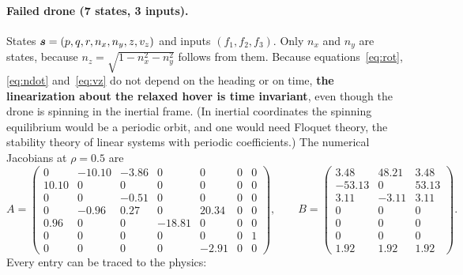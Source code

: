 \paragraph{Failed drone (7 states, 3 inputs).} States $\boldsymbol{s} = (p, q, r, n_x, n_y, z, v_z)$ and inputs $(f_1, f_2, f_3)$. Only $n_x$ and $n_y$ are states, because $n_z = \sqrt{1-n_x^2-n_y^2}$ follows from them. Because equations~\eqref{eq:rot}, \eqref{eq:ndot} and~\eqref{eq:vz} do not depend on the heading or on time, \textbf{the linearization about the relaxed hover is time invariant}, even though the drone is spinning in the inertial frame. (In inertial coordinates the spinning equilibrium would be a periodic orbit, and one would need Floquet theory, the stability theory of linear systems with periodic coefficients.) The numerical Jacobians at $\rho=0.5$ are
\begin{equation}
A = \begin{pmatrix}
 0 & -10.10 & -3.86 & 0 & 0 & 0 & 0\\
 10.10 & 0 & 0 & 0 & 0 & 0 & 0\\
 0 & 0 & -0.51 & 0 & 0 & 0 & 0\\
 0 & -0.96 & 0.27 & 0 & 20.34 & 0 & 0\\
 0.96 & 0 & 0 & -18.81 & 0 & 0 & 0\\
 0 & 0 & 0 & 0 & 0 & 0 & 1\\
 0 & 0 & 0 & 0 & -2.91 & 0 & 0
\end{pmatrix},\qquad
B = \begin{pmatrix}
 3.48 & 48.21 & 3.48\\
 -53.13 & 0 & 53.13\\
 3.11 & -3.11 & 3.11\\
 0 & 0 & 0\\ 0 & 0 & 0\\ 0 & 0 & 0\\
 1.92 & 1.92 & 1.92
\end{pmatrix}.
\end{equation}
Every entry can be traced to the physics:

